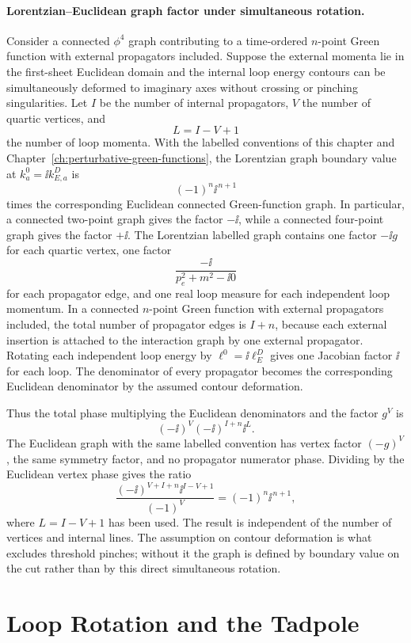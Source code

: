 \paragraph{Lorentzian--Euclidean graph factor under simultaneous rotation.}
Consider a connected \(\phi^4\) graph contributing to a time-ordered
\(n\)-point Green function with external propagators included.  Suppose the
external momenta lie in the first-sheet Euclidean domain and the internal loop
energy contours can be simultaneously deformed to imaginary axes without
crossing or pinching singularities.  Let \(I\) be the number of internal
propagators, \(V\) the number of quartic vertices, and
\[
  L=I-V+1
\]
the number of loop momenta.  With the labelled conventions of this chapter
and Chapter~\ref{ch:perturbative-green-functions}, the Lorentzian graph
boundary value at \(k_a^0=\ii k_{E,a}^D\) is
\[
  (-1)^n\ii^{\,n+1}
\]
times the corresponding Euclidean connected Green-function graph.  In
particular, a connected two-point graph gives the factor \(-\ii\), while a
connected four-point graph gives the factor \(+\ii\).
The Lorentzian labelled graph contains one factor \(-\ii g\) for each quartic
vertex, one factor
\[
  \frac{-\ii}{p_e^2+m^2-\ii0}
\]
for each propagator edge, and one real loop measure for each independent loop
momentum.  In a connected \(n\)-point Green function with external propagators
included, the total number of propagator edges is \(I+n\), because each
external insertion is attached to the interaction graph by one external
propagator.  Rotating each independent loop energy by
\(\ell^0=\ii\ell_E^D\) gives one Jacobian factor \(\ii\) for each loop.
The denominator of every propagator becomes the corresponding Euclidean
denominator by the assumed contour deformation.

Thus the total phase multiplying the Euclidean denominators and the factor
\(g^V\) is
\[
  (-\ii)^V(-\ii)^{I+n}\ii^L .
\]
The Euclidean graph with the same labelled convention has vertex factor
\((-g)^V\), the same symmetry factor, and no propagator numerator phase.
Dividing by the Euclidean vertex phase gives the ratio
\[
  \frac{(-\ii)^{V+I+n}\ii^{I-V+1}}{(-1)^V}
  =
  (-1)^n\ii^{\,n+1},
\]
where \(L=I-V+1\) has been used.  The result is independent of the number of
vertices and internal lines.  The assumption on contour deformation is what
excludes threshold pinches; without it the graph is defined by boundary value
on the cut rather than by this direct simultaneous rotation.

\section{Loop Rotation and the Tadpole}


